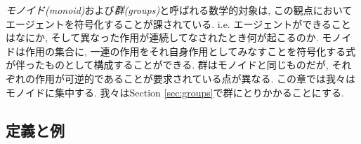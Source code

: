 
\emph{モノイド(monoid)}および\emph{群(groups)}と呼ばれる数学的対象は, この観点においてエージェントを符号化することが課されている. i.e. エージェントができることはなにか, そして異なった作用が連続してなされたとき何が起こるのか. モノイドは作用の集合に, 一連の作用をそれ自身作用としてみなすことを符号化する式が伴ったものとして構成することができる. 群はモノイドと同じものだが, それぞれの作用が可逆的であることが要求されている点が異なる. この章では我々はモノイドに集中する. 我々はSection \ref{sec:groups}で群にとりかかることにする.


\subsection{定義と例}

